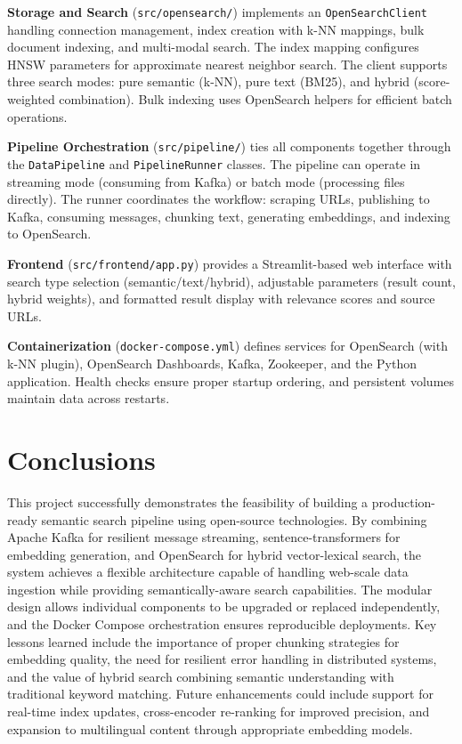 \documentclass[12pt, a4paper]{article}
\begin{document}
\textbf{Storage and Search} (\texttt{src/opensearch/}) implements an \texttt{OpenSearchClient} handling connection management, index creation with k-NN mappings, bulk document indexing, and multi-modal search. The index mapping configures HNSW parameters for approximate nearest neighbor search. The client supports three search modes: pure semantic (k-NN), pure text (BM25), and hybrid (score-weighted combination). Bulk indexing uses OpenSearch helpers for efficient batch operations.

\textbf{Pipeline Orchestration} (\texttt{src/pipeline/}) ties all components together through the \texttt{DataPipeline} and \texttt{PipelineRunner} classes. The pipeline can operate in streaming mode (consuming from Kafka) or batch mode (processing files directly). The runner coordinates the workflow: scraping URLs, publishing to Kafka, consuming messages, chunking text, generating embeddings, and indexing to OpenSearch.

\textbf{Frontend} (\texttt{src/frontend/app.py}) provides a Streamlit-based web interface with search type selection (semantic/text/hybrid), adjustable parameters (result count, hybrid weights), and formatted result display with relevance scores and source URLs.

\textbf{Containerization} (\texttt{docker-compose.yml}) defines services for OpenSearch (with k-NN plugin), OpenSearch Dashboards, Kafka, Zookeeper, and the Python application. Health checks ensure proper startup ordering, and persistent volumes maintain data across restarts.

\section{Conclusions}

This project successfully demonstrates the feasibility of building a production-ready semantic search pipeline using open-source technologies. By combining Apache Kafka for resilient message streaming, sentence-transformers for embedding generation, and OpenSearch for hybrid vector-lexical search, the system achieves a flexible architecture capable of handling web-scale data ingestion while providing semantically-aware search capabilities. The modular design allows individual components to be upgraded or replaced independently, and the Docker Compose orchestration ensures reproducible deployments. Key lessons learned include the importance of proper chunking strategies for embedding quality, the need for resilient error handling in distributed systems, and the value of hybrid search combining semantic understanding with traditional keyword matching. Future enhancements could include support for real-time index updates, cross-encoder re-ranking for improved precision, and expansion to multilingual content through appropriate embedding models.
\end{document}
